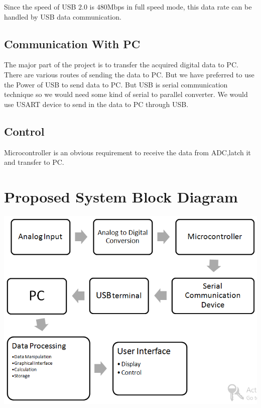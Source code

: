 \documentclass[12pt,a4paper]{article}
\begin{document}
Since the speed of USB $2.0$ is $480$Mbps in full speed mode, this data rate can be handled by USB data communication.\\

\subsection{Communication With PC}
The major part of the project is to transfer the acquired digital data to PC. There are various routes of sending the data to PC. But we have preferred to use the Power of USB to send data to PC. But USB is serial communication technique so we would need some kind of  serial to parallel converter. We would use USART device to send in the data to PC through USB.

\subsection{Control}
Microcontroller is an obvious requirement to receive the data from ADC,latch it and transfer to PC.

\section{Proposed System Block Diagram}
\includegraphics[scale=.5]{./Image/blockdiagram1.PNG}
\end{document}
